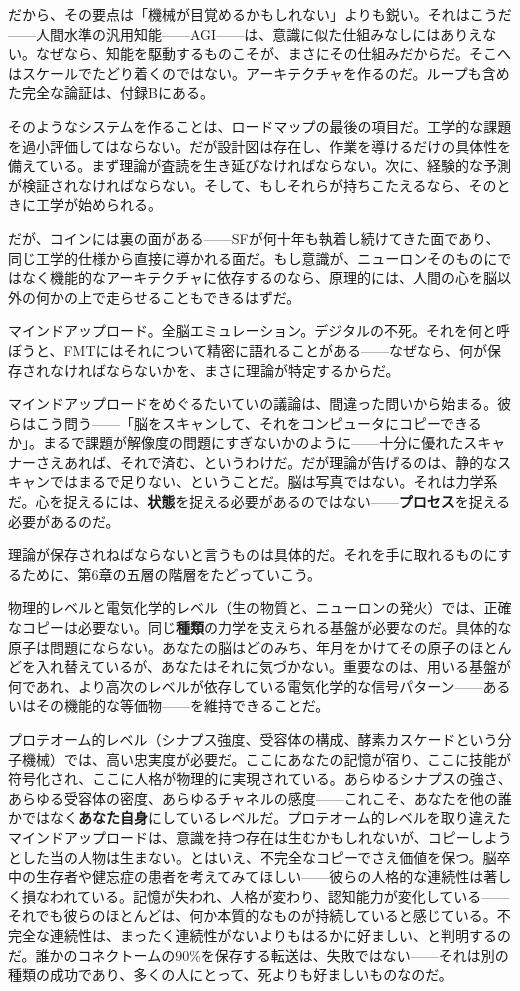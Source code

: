 \documentclass[11pt, twoside, openright]{book}
\begin{document}
だから、その要点は「機械が目覚めるかもしれない」よりも鋭い。それはこうだ------人間水準の汎用知能------AGI------は、意識に似た仕組みなしにはありえない。なぜなら、知能を駆動するものこそが、まさにその仕組みだからだ。そこへはスケールでたどり着くのではない。アーキテクチャを作るのだ。ループも含めた完全な論証は、付録Bにある。

そのようなシステムを作ることは、ロードマップの最後の項目だ。工学的な課題を過小評価してはならない。だが設計図は存在し、作業を導けるだけの具体性を備えている。まず理論が査読を生き延びなければならない。次に、経験的な予測が検証されなければならない。そして、もしそれらが持ちこたえるなら、そのときに工学が始められる。


だが、コインには裏の面がある------SFが何十年も執着し続けてきた面であり、同じ工学的仕様から直接に導かれる面だ。もし意識が、ニューロンそのものにではなく機能的なアーキテクチャに依存するのなら、原理的には、人間の心を脳以外の何かの上で走らせることもできるはずだ。

マインドアップロード。全脳エミュレーション。デジタルの不死。それを何と呼ぼうと、FMTにはそれについて精密に語れることがある------なぜなら、何が保存されなければならないかを、まさに理論が特定するからだ。

マインドアップロードをめぐるたいていの議論は、間違った問いから始まる。彼らはこう問う------「脳をスキャンして、それをコンピュータにコピーできるか」。まるで課題が解像度の問題にすぎないかのように------十分に優れたスキャナーさえあれば、それで済む、というわけだ。だが理論が告げるのは、静的なスキャンではまるで足りない、ということだ。脳は写真ではない。それは力学系だ。心を捉えるには、\textbf{状態}を捉える必要があるのではない------\textbf{プロセス}を捉える必要があるのだ。

理論が保存されねばならないと言うものは具体的だ。それを手に取れるものにするために、第6章の五層の階層をたどっていこう。

物理的レベルと電気化学的レベル（生の物質と、ニューロンの発火）では、正確なコピーは必要ない。同じ\textbf{種類}の力学を支えられる基盤が必要なのだ。具体的な原子は問題にならない。あなたの脳はどのみち、年月をかけてその原子のほとんどを入れ替えているが、あなたはそれに気づかない。重要なのは、用いる基盤が何であれ、より高次のレベルが依存している電気化学的な信号パターン------あるいはその機能的な等価物------を維持できることだ。

プロテオーム的レベル（シナプス強度、受容体の構成、酵素カスケードという分子機械）では、高い忠実度が必要だ。ここにあなたの記憶が宿り、ここに技能が符号化され、ここに人格が物理的に実現されている。あらゆるシナプスの強さ、あらゆる受容体の密度、あらゆるチャネルの感度------これこそ、あなたを他の誰かではなく\textbf{あなた自身}にしているレベルだ。プロテオーム的レベルを取り違えたマインドアップロードは、意識を持つ存在は生むかもしれないが、コピーしようとした当の人物は生まない。とはいえ、不完全なコピーでさえ価値を保つ。脳卒中の生存者や健忘症の患者を考えてみてほしい------彼らの人格的な連続性は著しく損なわれている。記憶が失われ、人格が変わり、認知能力が変化している------それでも彼らのほとんどは、何か本質的なものが持続していると感じている。不完全な連続性は、まったく連続性がないよりもはるかに好ましい、と判明するのだ。誰かのコネクトームの90\%を保存する転送は、失敗ではない------それは別の種類の成功であり、多くの人にとって、死よりも好ましいものなのだ。
\end{document}
